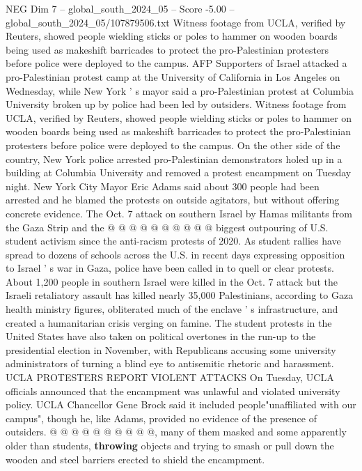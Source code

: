 \begin{textsample}{NEG Dim 7 – global\_south\_2024\_05 – Score -5.00 – global\_south\_2024\_05/107879506.txt}  \label{ex:f7_neg_388}
Witness footage from UCLA, verified by Reuters, showed people wielding sticks or poles to hammer on wooden boards being used as makeshift barricades to protect the pro-Palestinian protesters before police were deployed to the campus.
AFP Supporters of Israel attacked a pro-Palestinian protest camp at the University of California in Los Angeles on Wednesday, while New York ' s mayor said a pro-Palestinian protest at Columbia University broken up by police had been led by outsiders.
Witness footage from UCLA, verified by Reuters, showed people wielding sticks or poles to hammer on wooden boards being used as makeshift barricades to protect the pro-Palestinian protesters before police were deployed to the campus.
On the other side of the country, New York police arrested pro-Palestinian demonstrators holed up in a building at Columbia University and removed a protest encampment on Tuesday night.
New York City Mayor Eric Adams said about 300 people had been arrested and he blamed the protests on outside agitators, but without offering concrete evidence.
The Oct. 7 attack on southern Israel by Hamas militants from the Gaza Strip and the @ @ @ @ @ @ @ @ @ @ biggest outpouring of U.S. student activism since the anti-racism protests of 2020.
As student rallies have spread to dozens of schools across the U.S. in recent days expressing opposition to Israel ' s war in Gaza, police have been called in to quell or clear protests.
About 1,200 people in southern Israel were killed in the Oct. 7 attack but the Israeli retaliatory assault has killed nearly 35,000 Palestinians, according to Gaza health ministry figures, obliterated much of the enclave ' s infrastructure, and created a humanitarian crisis verging on famine.
The student protests in the United States have also taken on political overtones in the run-up to the presidential election in November, with Republicans accusing some university administrators of turning a blind eye to antisemitic rhetoric and harassment.
UCLA PROTESTERS REPORT VIOLENT ATTACKS On Tuesday, UCLA officials announced that the encampment was unlawful and violated university policy.
UCLA Chancellor Gene Brock said it included people"unaffiliated with our campus", though he, like Adams, provided no evidence of the presence of outsiders. @ @ @ @ @ @ @ @ @ @, many of them masked and some apparently older than students, \textbf{throwing} objects and trying to smash or pull down the wooden and steel barriers erected to shield the encampment.

\end{textsample}
